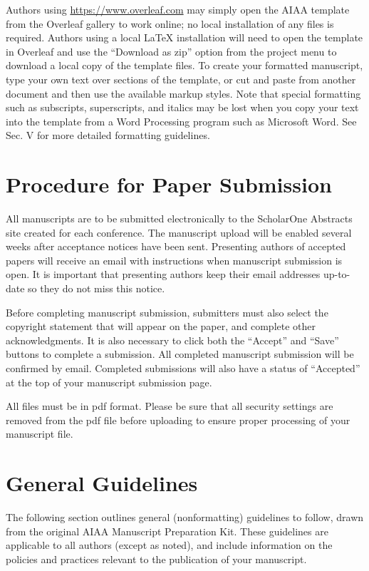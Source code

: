 \documentclass[conf]{new-aiaa}
\begin{document}
Authors using \url{https://www.overleaf.com} may simply open the AIAA template from the Overleaf gallery to work online; no local installation of any files is required. Authors using a local \LaTeX{} installation will need to open the template in Overleaf and use the ``Download as zip'' option from the project menu to download a local copy of the template files. To create your formatted manuscript, type your own text over sections of the template, or cut and paste from another document and then use the available markup styles. Note that special formatting such as subscripts, superscripts, and italics may be lost when you copy your text into the template from a Word Processing program such as Microsoft Word. See Sec. V for more detailed formatting guidelines.

\section{Procedure for Paper Submission}

All manuscripts are to be submitted electronically to the ScholarOne Abstracts site created for each conference. The manuscript upload will be enabled several weeks after acceptance notices have been sent. Presenting authors of accepted papers will receive an email with instructions when manuscript submission is open. It is important that presenting authors keep their email addresses up-to- date so they do not miss this notice.

Before completing manuscript submission, submitters must also select the copyright statement that will appear on the paper, and complete other acknowledgments. It is also necessary to click both the ``Accept'' and ``Save'' buttons to complete a submission. All completed manuscript submission will be confirmed by email. Completed submissions will also have a status of ``Accepted'' at the top of your manuscript submission page.

All files must be in pdf format. Please be sure that all security settings are removed from the pdf file before uploading to ensure proper processing of your manuscript file.

\section{General Guidelines}

The following section outlines general (nonformatting) guidelines to follow, drawn from the original AIAA Manuscript Preparation Kit. These guidelines are applicable to all authors (except as noted), and include information on the policies and practices relevant to the publication of your manuscript.
\end{document}
